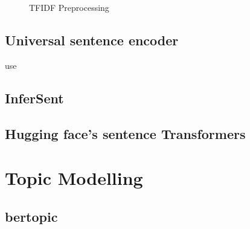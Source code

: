 \begin{figure}[htp] %
    \centering
    
    \caption{TFIDF Preprocessing}
    \label{fig:preprocessing}
\end{figure}

\subsection{Universal sentence encoder}\label{subsec:univ-sent-encoder}
\ac{use}
\cite{UniversalSentEnc2018}

\subsection{InferSent}\label{subsec:inferSent}
\cite{inferSent2018}

\subsection{Hugging face's sentence Transformers}\label{subsec:hf-sent-ransformers}
\cite{HfsentTrans2019}







\section{Topic Modelling}\label{sec:topic-modelling}

\subsection{\ac{bertopic}}\label{subsec:bertopic}

